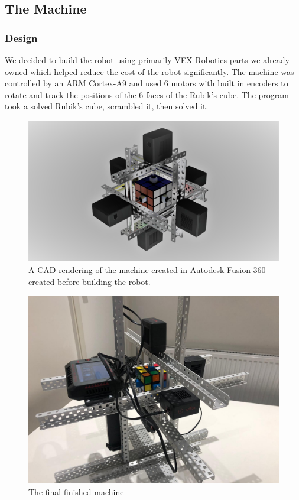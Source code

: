\documentclass[8pt]{article}
\begin{document}
\subsection{The Machine}

\subsubsection{Design}

We decided to build the robot using primarily VEX Robotics parts we already owned which helped
reduce the cost of the robot significantly. The machine was controlled by an ARM Cortex-A9 and
used 6 motors with built in encoders to rotate and track the positions of the 6 faces of the 
Rubik's cube. The program took a solved Rubik's cube, scrambled it, then solved it.


\begin{minipage}{0.45\textwidth}
\begin{figure}[H]
\centering
\includegraphics[scale=0.05]{main cad.jpg}
\caption{A CAD rendering of the machine created in Autodesk Fusion 360 created
before building the robot.}
\end{figure}
\end{minipage}%
\hfill
\begin{minipage}{0.45\textwidth}
\begin{figure}[H]
\centering
\includegraphics[scale=0.11]{final machine.jpg}
\caption{The final finished machine}
\end{figure}
\end{minipage}
\end{document}
